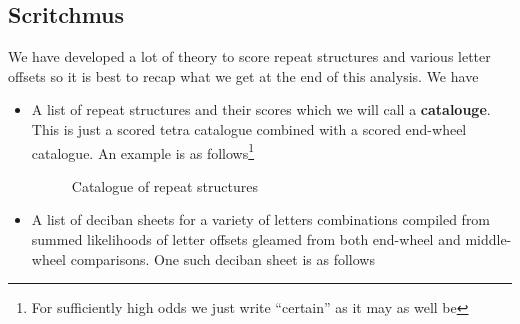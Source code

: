 \subsection{Scritchmus}
We have developed a lot of theory to score repeat structures and various letter offsets so it is best to recap what we get at the end of this analysis. We have
\begin{itemize}
	\item A list of repeat structures and their scores which we will call a {\bf{catalouge}}. This is just a scored tetra catalogue combined with a scored end-wheel catalogue. An example is as follows\footnote{For sufficiently high odds we just write ``certain'' as it may as well be}
	      \begin{figure}[H]

		      \begin{center}
		      \end{center}
		      \caption{Catalogue of repeat structures}
		      \label{fig:catalogue}
	      \end{figure}
	\item A list of deciban sheets for a variety of letters combinations compiled from summed likelihoods of letter offsets gleamed from both end-wheel and middle-wheel comparisons. One such deciban sheet is as follows

\end{itemize}
